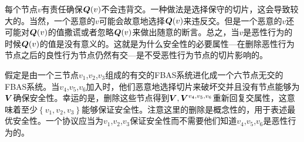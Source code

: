 每个节点$v$有责任确保${\bm Q}(v)$不会违背{\quorum}交。一种做法是选择保守的切片，这会导致较大的{\quorum}。当然，一个恶意的$v$可能会故意地选择${\bm Q}(v)$来违反{\quorum}交。但是一个恶意的$v$还可能对${\bm Q}(v)$的值撒谎或者忽略${\bm Q}(v)$来做出随意的断言。总之，当$v$是恶性行为的时候${\bm Q}(v)$的值是没有意义的。这就是为什么安全性的必要属性---在删除恶性行为节点之后的良性行为节点仍然有{\quorum}交---是不受恶性行为节点的切片影响的。

假定是由一个三节点$v_1$,$v_2$,$v_3$组成的有{\quorum}交的FBAS系统进化成一个六节点无{\quorum}交的FBAS系统。当$v_4$,$v_5$,$v_6$加入时，他们恶意地选择切片来破坏{\quorum}交并且没有节点能够为${\bm V}$确保安全性。幸运的是，删除这些节点得到${\bm V},{\bm V}^{v_4,v_5,v_6}$重新回复{\quorum}交属性，这意味着至少$\left\{v_1,v_2,v_3\right\}$能够保证安全性。注意这里的删除是概念性的，用于表述最优安全性。一个协议应当为$v_1$,$v_2$,$v_3$保证安全性而不需要他们知道$v_4$,$v_5$,$v_6$是恶性行为的。